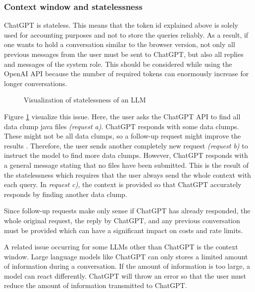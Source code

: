 \subsubsection{Context window and statelessness}

ChatGPT is stateless. This means that the token id explained above is solely used for accounting purposes and not to store the queries reliably. As a result, if one wants to hold a conversation similar to the browser version,  not only all previous messages from the user must be sent to ChatGPT, but also all replies and messages of the system role. This should be considered while using the OpenAI \ac{API} because the number of required tokens can enormously increase for longer conversations.

\begin{figure}
    \centering
    
    \caption{Visualization of statelessness of an \ac{LLM}}
    \label{fig:chatgpt_stateless}
\end{figure}


Figure \ref{fig:chatgpt_stateless} visualize this issue. Here, the user asks the ChatGPT API to find all data clump java files \textit{(request a)}. ChatGPT responds with some data clumps. These might not be all data clumps, so a follow-up request might improve the results \cite{10062688}. Therefore, the user sends another completely new request \textit{(request b)} to instruct the model to find more data clumps. However, ChatGPT responds with a general message stating that no files have been submitted. This is the result of the statelessness which requires that the user always send the whole context with each query. In \textit{request c)}, the context is provided so that ChatGPT accurately responds by finding another data clump.

Since follow-up requests make only sense if ChatGPT has already responded, the whole original request, the reply by ChatGPT, and any previous conversation must be provided which can have a significant impact on costs and rate limits. 

A related issue occurring for some \acp{LLM} other than ChatGPT is the context window. Large language models like ChatGPT can only stores a limited amount of information during a conversation. If the amount of information is too large,  a model can react differently. ChatGPT will throw an error so that the user must reduce the amount of information transmitted to ChatGPT.

